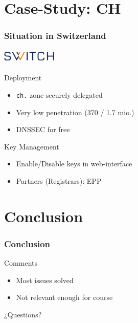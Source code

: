 \documentclass{beamer}
\begin{document}

\section{Case-Study: CH}

\begin{frame}
  \frametitle{Situation in Switzerland}
  \framesubtitle{\includegraphics[width=2.6cm]{SWITCH-logo}}

  \begin{block}{Deployment}
    \begin{itemize}
    \item \texttt{ch.} zone securely delegated
    \item Very low penetration (370 / 1.7 mio.)
    \item DNSSEC for free
    \end{itemize}
  \end{block}

  \pause

  \begin{block}{Key Management}
    \begin{itemize}
    \item Enable/Disable keys in web-interface
    \item Partners (Registrars): EPP
    \end{itemize}
  \end{block}
\end{frame}

\section{Conclusion}

\begin{frame}
  \frametitle{Conclusion}
  
  \begin{block}{Comments}
    \begin{itemize}
    \item Most issues solved
    \item Not relevant enough for course
    \end{itemize}
  \end{block}

  \pause

  \begin{block}{¿Questions?}
  \end{block}
  
\end{frame}
\end{document}
